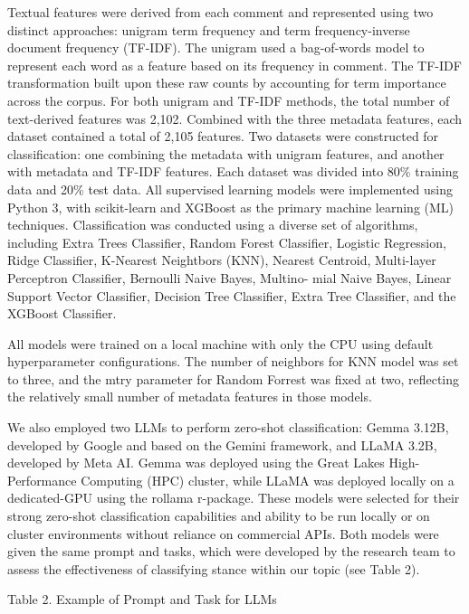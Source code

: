 \documentclass[
  12pt]{article}
\begin{document}
Textual features were derived from each comment and represented using
two distinct approaches: unigram term frequency and term
frequency-inverse document frequency (TF-IDF). The unigram used a
bag-of-words model to represent each word as a feature based on its
frequency in comment. The TF-IDF transformation built upon these raw
counts by accounting for term importance across the corpus. For both
unigram and TF-IDF methods, the total number of text-derived features
was 2,102. Combined with the three metadata features, each dataset
contained a total of 2,105 features. Two datasets were constructed for
classification: one combining the metadata with unigram features, and
another with metadata and TF-IDF features. Each dataset was divided into
80\% training data and 20\% test data. All supervised learning models
were implemented using Python 3, with scikit-learn and XGBoost as the
primary machine learning (ML) techniques. Classification was conducted
using a diverse set of algorithms, including Extra Trees Classifier,
Random Forest Classifier, Logistic Regression, Ridge Classifier,
K-Nearest Neightbors (KNN), Nearest Centroid, Multi-layer Perceptron
Classifier, Bernoulli Naive Bayes, Multino- mial Naive Bayes, Linear
Support Vector Classifier, Decision Tree Classifier, Extra Tree
Classifier, and the XGBoost Classifier.

All models were trained on a local machine with only the CPU using
default hyperparameter configurations. The number of neighbors for KNN
model was set to three, and the mtry parameter for Random Forrest was
fixed at two, reflecting the relatively small number of metadata
features in those models.

We also employed two LLMs to perform zero-shot classification: Gemma
3.12B, developed by Google and based on the Gemini framework, and LLaMA
3.2B, developed by Meta AI. Gemma was deployed using the Great Lakes
High-Performance Computing (HPC) cluster, while LLaMA was deployed
locally on a dedicated-GPU using the rollama r-package. These models
were selected for their strong zero-shot classification capabilities and
ability to be run locally or on cluster environments without reliance on
commercial APIs. Both models were given the same prompt and tasks, which
were developed by the research team to assess the effectiveness of
classifying stance within our topic (see Table 2).

Table 2. Example of Prompt and Task for LLMs
\end{document}
